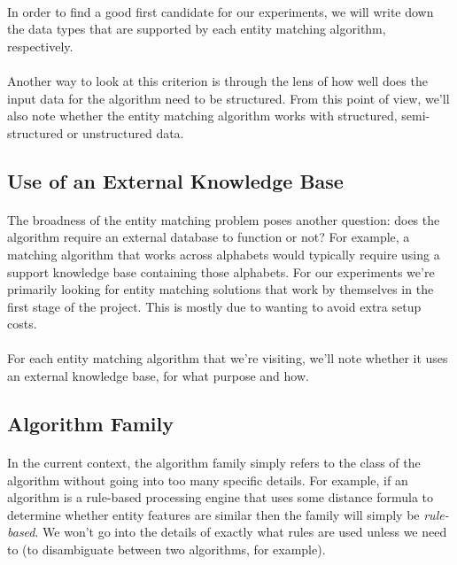\documentclass[a4paper,12pt]{article}
\begin{document}
\paragraph{}In order to find a good first candidate for our experiments, we will
write down the data types that are supported by each entity matching algorithm,
respectively.
\paragraph{}Another way to look at this criterion is through the lens of how
well does the input data for the algorithm need to be structured. From this
point of view, we'll also note whether the entity matching algorithm works with
structured, semi-structured or unstructured data.

\subsection{Use of an External Knowledge Base}
\paragraph{}The broadness of the entity matching problem poses another question:
does the algorithm require an external database to function or not? For example,
a matching algorithm that works across alphabets would typically require using
a support knowledge base containing those alphabets. For our experiments we're
primarily looking for entity matching solutions that work by themselves in the
first stage of the project. This is mostly due to wanting to avoid extra setup
costs.
\paragraph{}For each entity matching algorithm that we're visiting, we'll note
whether it uses an external knowledge base, for what purpose and how.

\subsection{Algorithm Family}
\paragraph{}In the current context, the algorithm family simply refers
to the class of the algorithm without going into too many specific
details. For example, if an algorithm is a rule-based processing engine
that uses some distance formula to determine whether entity features are
similar then the family will simply be \textit{rule-based}. We won't
go into the details of exactly what rules are used unless we need to
(to disambiguate between two algorithms, for example).
\end{document}
